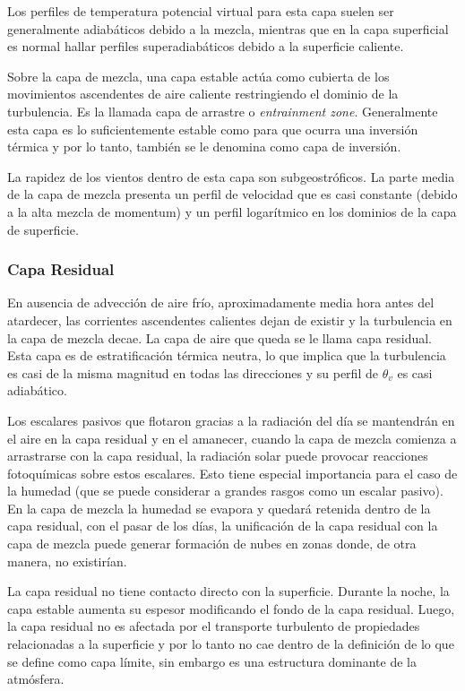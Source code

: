 Los perfiles de temperatura potencial virtual para esta capa suelen ser generalmente adiabáticos debido a la mezcla, mientras que en la capa superficial es normal hallar perfiles superadiabáticos debido a la superficie caliente.

Sobre la capa de mezcla, una capa estable actúa como cubierta de los movimientos ascendentes de aire caliente restringiendo el dominio de la turbulencia. Es la llamada capa de arrastre o \emph{entrainment zone}. Generalmente esta capa es lo suficientemente estable como para que ocurra una inversión térmica y por lo tanto, también se le denomina como capa de inversión.

La rapidez de los vientos dentro de esta capa son subgeostróficos. La parte media de la capa de mezcla presenta un perfil de velocidad que es casi constante (debido a la alta mezcla de momentum) y un perfil logarítmico en los dominios de la capa de superficie.

\subsubsection{Capa Residual}
En ausencia de advección de aire frío, aproximadamente media hora antes del atardecer, las corrientes ascendentes calientes dejan de existir y la turbulencia en la capa de mezcla decae. La capa de aire que queda se le llama capa residual. Esta capa es de estratificación térmica neutra, lo que implica que la turbulencia es casi de la misma magnitud en todas las direcciones y su perfil de $\theta_v$ es casi adiabático.

Los escalares pasivos que flotaron gracias a la radiación del día se mantendrán en el aire en la capa residual y en el amanecer, cuando la capa de mezcla comienza a arrastrarse con la capa residual, la radiación solar puede provocar reacciones fotoquímicas sobre estos escalares. Esto tiene especial importancia para el caso de la humedad (que se puede considerar a grandes rasgos como un escalar pasivo). En la capa de mezcla la humedad se evapora y quedará retenida dentro de la capa residual, con el pasar de los días, la unificación de la capa residual con la capa de mezcla puede generar formación de nubes en zonas donde, de otra manera, no existirían.

La capa residual no tiene contacto directo con la superficie. Durante la noche, la capa estable aumenta su espesor modificando el fondo de la capa residual. Luego, la capa residual no es afectada por el transporte turbulento de propiedades relacionadas a la superficie y por lo tanto no cae dentro de la definición de lo que se define como capa límite, sin embargo es una estructura dominante de la atmósfera.
